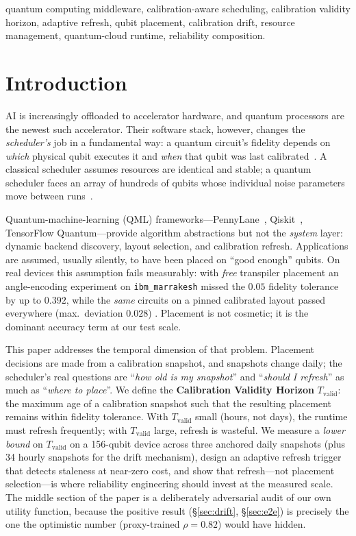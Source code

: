 \documentclass[journal,10pt,twocolumn]{IEEEtran}
\begin{document}
\begin{IEEEkeywords}
quantum computing middleware, calibration-aware scheduling, calibration validity horizon, adaptive refresh,
qubit placement, calibration drift, resource management, quantum-cloud runtime, reliability composition.
\end{IEEEkeywords}

\section{Introduction}
 AI is increasingly offloaded to accelerator hardware, and quantum processors are the
newest such accelerator. Their software stack, however, changes the \emph{scheduler's} job in a fundamental way: a
quantum circuit's fidelity depends on \emph{which} physical qubit executes it and \emph{when} that qubit was last
calibrated~\cite{preskill2018,arute2019,murali2019noise,li2019sabre}. A classical scheduler assumes resources are
identical and stable; a quantum scheduler faces an array of hundreds of qubits whose individual noise parameters
move between runs~\cite{ibmcalib,kanazawa2021,vanberg2023}.

Quantum-machine-learning (QML) frameworks---PennyLane~\cite{berholm2018}, Qiskit~\cite{qiskit}, TensorFlow
Quantum---provide algorithm abstractions but not the \emph{system} layer: dynamic backend discovery, layout
selection, and calibration refresh. Applications are assumed, usually silently, to have been placed on ``good
enough'' qubits. On real devices this assumption fails measurably: with \emph{free} transpiler placement an
angle-encoding experiment on \texttt{ibm\_marrakesh} missed the $0.05$ fidelity tolerance by up to $0.392$,
while the \emph{same} circuits on a pinned calibrated layout passed everywhere (max.\ deviation $0.028$)
\cite{tangpu}. Placement is not cosmetic; it is the dominant accuracy term at our test scale.

This paper addresses the temporal dimension of that problem. Placement decisions are made from a calibration
snapshot, and snapshots change daily; the scheduler's real questions are ``\emph{how old is my snapshot}'' and
``\emph{should I refresh}'' as much as ``\emph{where to place}''. We define the \textbf{Calibration Validity
Horizon} $T_{\mathrm{valid}}$: the maximum age of a calibration snapshot such that the resulting placement
remains within fidelity tolerance. With $T_{\mathrm{valid}}$ small (hours, not days), the runtime must refresh
frequently; with $T_{\mathrm{valid}}$ large, refresh is wasteful. We measure a \emph{lower bound} on
$T_{\mathrm{valid}}$ on a 156-qubit device across three anchored daily snapshots (plus 34 hourly
snapshots for the drift mechanism), design an adaptive refresh trigger that detects staleness at
near-zero cost, and show that refresh---not placement selection---is where reliability engineering
should invest at the measured scale.
The middle section of the paper is a deliberately adversarial audit of our own utility function, because the
positive result (\S\ref{sec:drift}, \S\ref{sec:e2e}) is precisely the one the optimistic number (proxy-trained
$\rho{=}0.82$) would have hidden.
\end{document}
